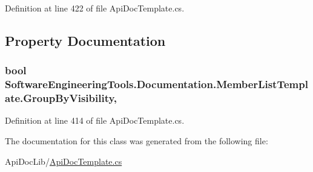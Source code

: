 Definition at line 422 of file Api\+Doc\+Template.\+cs.



\subsection{Property Documentation}
\hypertarget{class_software_engineering_tools_1_1_documentation_1_1_member_list_template_ae4d02d5b68476be52bfabae029c21135}{
\subsubsection[{Group\+By\+Visibility}]{\setlength{\rightskip}{0pt plus 5cm}bool Software\+Engineering\+Tools.\+Documentation.\+Member\+List\+Template.\+Group\+By\+Visibility\hspace{0.3cm}{\ttfamily [get]}, {\ttfamily [set]}}}\label{class_software_engineering_tools_1_1_documentation_1_1_member_list_template_ae4d02d5b68476be52bfabae029c21135}


Definition at line 414 of file Api\+Doc\+Template.\+cs.



The documentation for this class was generated from the following file\+:\begin{DoxyCompactItemize}
\item 
Api\+Doc\+Lib/\hyperlink{_api_doc_template_8cs}{Api\+Doc\+Template.\+cs}\end{DoxyCompactItemize}
